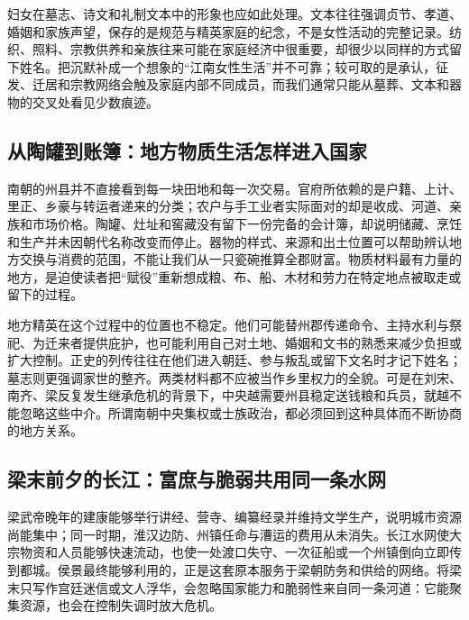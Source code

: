 妇女在墓志、诗文和礼制文本中的形象也应如此处理。文本往往强调贞节、孝道、婚姻和家族声望，保存的是规范与精英家庭的纪念，不是女性活动的完整记录。纺织、照料、宗教供养和亲族往来可能在家庭经济中很重要，却很少以同样的方式留下姓名。把沉默补成一个想象的“江南女性生活”并不可靠；较可取的是承认，征发、迁居和宗教网络会触及家庭内部不同成员，而我们通常只能从墓葬、文本和器物的交叉处看见少数痕迹。

\subsection{从陶罐到账簿：地方物质生活怎样进入国家}

南朝的州县并不直接看到每一块田地和每一次交易。官府所依赖的是户籍、上计、里正、乡豪与转运者递来的分类；农户与手工业者实际面对的却是收成、河道、亲族和市场价格。陶罐、灶址和窖藏没有留下一份完备的会计簿，却说明储藏、烹饪和生产并未因朝代名称改变而停止。器物的样式、来源和出土位置可以帮助辨认地方交换与消费的范围，不能让我们从一只瓷碗推算全郡财富。物质材料最有力量的地方，是迫使读者把“赋役”重新想成粮、布、船、木材和劳力在特定地点被取走或留下的过程。

地方精英在这个过程中的位置也不稳定。他们可能替州郡传递命令、主持水利与祭祀、为迁来者提供庇护，也可能利用自己对土地、婚姻和文书的熟悉来减少负担或扩大控制。正史的列传往往在他们进入朝廷、参与叛乱或留下文名时才记下姓名；墓志则更强调家世的整齐。两类材料都不应被当作乡里权力的全貌。可是在刘宋、南齐、梁反复发生继承危机的背景下，中央越需要州县稳定送钱粮和兵员，就越不能忽略这些中介。所谓南朝中央集权或士族政治，都必须回到这种具体而不断协商的地方关系。

\subsection{梁末前夕的长江：富庶与脆弱共用同一条水网}

梁武帝晚年的建康能够举行讲经、营寺、编纂经录并维持文学生产，说明城市资源尚能集中；同一时期，淮汉边防、州镇任命与漕运的费用从未消失。长江水网使大宗物资和人员能够快速流动，也使一处渡口失守、一次征船或一个州镇倒向立即传到都城。侯景最终能够利用的，正是这套原本服务于梁朝防务和供给的网络。将梁末只写作宫廷迷信或文人浮华，会忽略国家能力和脆弱性来自同一条河道：它能聚集资源，也会在控制失调时放大危机。
